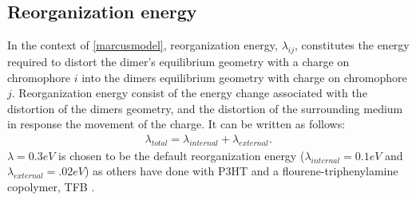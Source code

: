 \subsection{Reorganization energy}

In the context of \autoref{marcusmodel}, 
reorganization energy, $\lambda_{ij}$, constitutes the energy required to distort the dimer's equilibrium geometry with a
charge on chromophore $i$ into the dimers equilibrium geometry with charge on chromophore $j$.
Reorganization energy consist of the energy change associated with the distortion of the dimers geometry,
and the distortion of the surrounding medium in response the movement of the charge. It can be written as
follows:
\begin{align}
    \lambda_{total} = \lambda_{internal} + \lambda_{external}.
\end{align} 
$\lambda = 0.3eV$ is chosen to be the default reorganization energy ($\lambda_{internal} = 0.1eV$
and $\lambda_{external} = .02eV$) as others have done with P3HT \cite{jones2017} and
a flourene-triphenylamine copolymer, TFB \cite{Gali2017}. 

